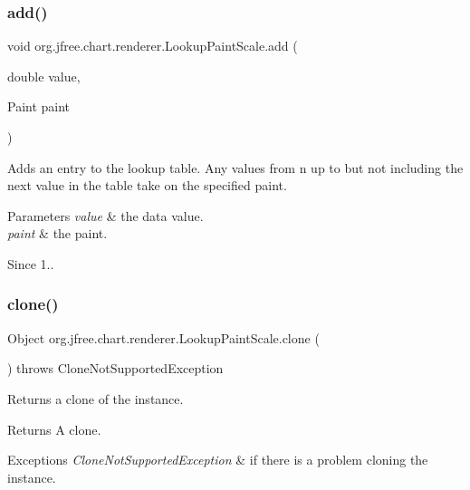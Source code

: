 \subsubsection{\texorpdfstring{add()}{add()}\hspace{0.1cm}{\footnotesize\ttfamily [2/2]}}
{\footnotesize\ttfamily void org.\+jfree.\+chart.\+renderer.\+Lookup\+Paint\+Scale.\+add (\begin{DoxyParamCaption}\item[{double}]{value,  }\item[{Paint}]{paint }\end{DoxyParamCaption})}

Adds an entry to the lookup table. Any values from {\ttfamily n} up to but not including the next value in the table take on the specified {\ttfamily paint}.


\begin{DoxyParams}{Parameters}
{\em value} & the data value. \\
\hline
{\em paint} & the paint.\\
\hline
\end{DoxyParams}
\begin{DoxySince}{Since}
1.. 
\end{DoxySince}
\mbox{\label{classorg_1_1jfree_1_1chart_1_1renderer_1_1_lookup_paint_scale_a6af6382886c03d69dc8e490959a642ad}} 
\subsubsection{\texorpdfstring{clone()}{clone()}}
{\footnotesize\ttfamily Object org.\+jfree.\+chart.\+renderer.\+Lookup\+Paint\+Scale.\+clone (\begin{DoxyParamCaption}{ }\end{DoxyParamCaption}) throws Clone\+Not\+Supported\+Exception}

Returns a clone of the instance.

\begin{DoxyReturn}{Returns}
A clone.
\end{DoxyReturn}

\begin{DoxyExceptions}{Exceptions}
{\em Clone\+Not\+Supported\+Exception} & if there is a problem cloning the instance. \\
\hline
\end{DoxyExceptions}
\mbox{\label{classorg_1_1jfree_1_1chart_1_1renderer_1_1_lookup_paint_scale_ae3a42b32c206176fdd037699d5e9e2cc}} 

